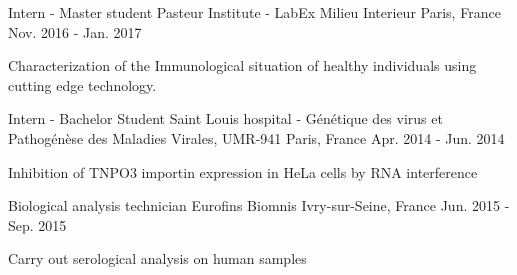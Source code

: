 \begin{cventries}
%


  \cventry
    {Intern - Master student} %
    {Pasteur Institute - LabEx Milieu Interieur} %
    {Paris, France} %
    {Nov. 2016 - Jan. 2017} %
    {
      \begin{cvitems} %
        \item {Characterization of the Immunological situation of healthy individuals using cutting edge technology.}
      \end{cvitems}
    }

  \cventry
    {Intern - Bachelor Student} %
    {Saint Louis hospital - Génétique des virus et Pathogénèse des Maladies Virales, UMR-941} %
    {Paris, France} %
    {Apr. 2014 - Jun. 2014} %
    {
      \begin{cvitems} %
        \item {Inhibition of TNPO3 importin expression in HeLa cells by RNA interference}
      \end{cvitems}
    }

  \cventry
    {Biological analysis technician} %
    {Eurofins Biomnis} %
    {Ivry-sur-Seine, France} %
    {Jun. 2015 - Sep. 2015} %
    {
      \begin{cvitems} %
        \item {Carry out serological analysis on human samples}
      \end{cvitems}
    }
    
\end{cventries}
